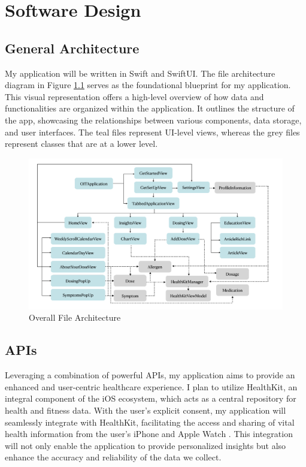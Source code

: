 \chapter{Software Design}

\section{General Architecture}

My application will be written in Swift and SwiftUI. The file architecture diagram in Figure \ref{fig:overall-file-architecture} serves as the foundational blueprint for my application. This visual representation offers a high-level overview of how data and functionalities are organized within the application. It outlines the structure of the app, showcasing the relationships between various components, data storage, and user interfaces. The teal files represent UI-level views, whereas the grey files represent classes that are at a lower level.

\begin{figure}[H]
    \centering
    \includegraphics[width=1\linewidth]{thesis/chapters/images/overallFileArchitecture.png}
    \caption{Overall File Architecture}
    \label{fig:overall-file-architecture}
\end{figure}

\section{APIs}

Leveraging a combination of powerful APIs, my application aims to provide an enhanced and user-centric healthcare experience. I plan to utilize HealthKit, an integral component of the iOS ecosystem, which acts as a central repository for health and fitness data. With the user's explicit consent, my application will seamlessly integrate with HealthKit, facilitating the access and sharing of vital health information from the user's iPhone and Apple Watch \cite{HealthKit}. This integration will not only enable the application to provide personalized insights but also enhance the accuracy and reliability of the data we collect.

